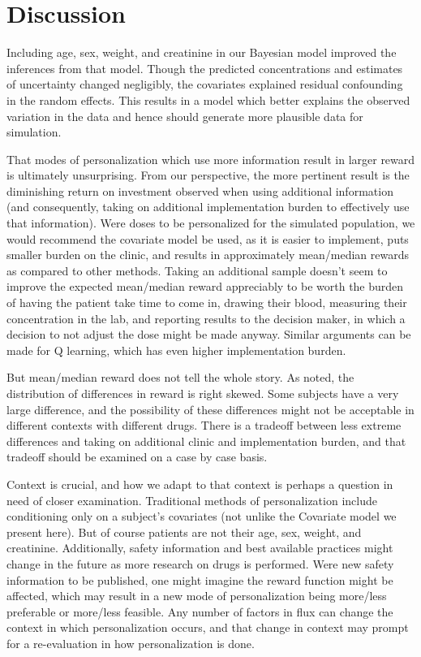 \section{Discussion}

Including age, sex, weight, and creatinine in our Bayesian model improved the inferences from that model.  Though the predicted concentrations and estimates of uncertainty changed negligibly, the covariates explained residual confounding in the random effects. This results in a model which better explains the observed variation in the data and hence should generate more plausible data for simulation.

That modes of personalization which use more information result in larger reward is ultimately unsurprising. From our perspective, the more pertinent result is the diminishing return on investment observed when using additional information (and consequently, taking on additional implementation burden to effectively use that information).  Were doses to be personalized for the simulated population, we would recommend the covariate model be used, as it is easier to implement, puts smaller burden on the clinic, and results in approximately mean/median rewards as compared to other methods.  Taking an additional sample doesn’t seem to improve the expected mean/median reward appreciably to be worth the burden of having the patient take time to come in, drawing their blood, measuring their concentration in the lab, and reporting results to the decision maker, in which a decision to not adjust the dose might be made anyway. Similar arguments can be made for Q learning, which has even higher implementation burden.

But mean/median reward does not tell the whole story.  As noted, the distribution of differences in reward is right skewed.  Some subjects have a very large difference, and the possibility of these differences might not be acceptable in different contexts with different drugs.  There is a tradeoff between less extreme differences and taking on additional clinic and implementation burden, and that tradeoff should be examined on a case by case basis.

Context is crucial, and how we adapt to that context is perhaps a question in need of closer examination.  Traditional methods of personalization include conditioning only on a subject’s covariates (not unlike the Covariate model we present here).  But of course patients are not their age, sex, weight, and creatinine.  Additionally, safety information and best available practices might change in the future as more research on drugs is performed. Were new safety information to be published, one might imagine the reward function might be affected, which may result in a new mode of personalization being more/less preferable or more/less feasible.  Any number of factors in flux can change the context in which personalization occurs, and that change in context may prompt for a re-evaluation in how personalization is done.

